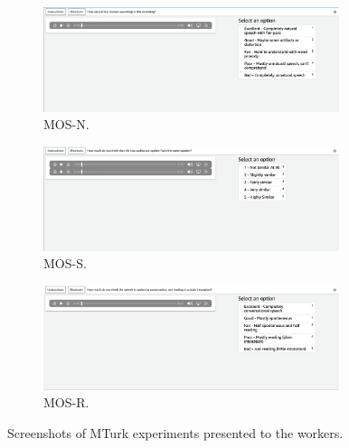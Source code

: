 \begin{figure}[!htb]
\centering
    \begin{subfigure}{\textwidth}
    \includegraphics[width=0.95\textwidth]{imgs/Nature_MOS.png}
    \caption{MOS-N.}
    \label{fig:MOS_N}
    \end{subfigure}
    \begin{subfigure}{\textwidth}
    \includegraphics[width=0.95\textwidth]{imgs/Similarity_MOS.png}
    \caption{MOS-S.}
    \label{fig:MOS_S}
    \end{subfigure}
    \begin{subfigure}{\textwidth}
    \includegraphics[width=0.95\textwidth]{imgs/Spon_MOS.png}
    \caption{MOS-R.}
    \label{fig:MOS_N}
    \end{subfigure}
\caption{Screenshots of MTurk experiments presented to the workers.}
\label{fig:MOS_exps}
\end{figure}
